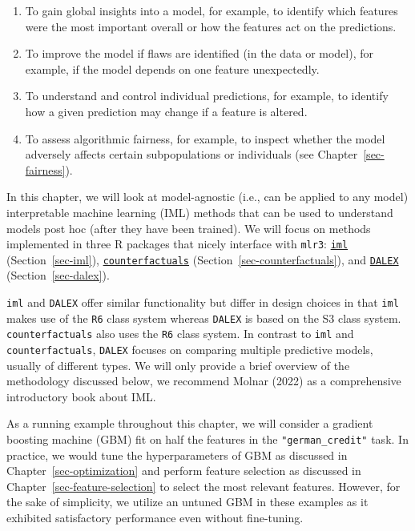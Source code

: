 \begin{enumerate}
\def\labelenumi{\arabic{enumi}.}
\tightlist
\item
  To gain global insights into a model, for example, to identify which
  features were the most important overall or how the features act on
  the predictions.
\item
  To improve the model if flaws are identified (in the data or model),
  for example, if the model depends on one feature unexpectedly.
\item
  To understand and control individual predictions, for example, to
  identify how a given prediction may change if a feature is altered.
\item
  To assess algorithmic fairness, for
  example, to inspect whether the model adversely affects certain
  subpopulations or individuals (see Chapter~\ref{sec-fairness}).
\end{enumerate}

In this chapter, we will look at model-agnostic (i.e., can be applied to
any model) interpretable machine
learning (IML) methods that can be used to
understand models post hoc (after they have been
trained). We will focus on methods implemented in three R packages that
nicely interface with \texttt{mlr3}:
\href{https://cran.r-project.org/package=iml}{\texttt{iml}}
(Section~\ref{sec-iml}),
\href{https://cran.r-project.org/package=counterfactuals}{\texttt{counterfactuals}}
(Section~\ref{sec-counterfactuals}), and
\href{https://cran.r-project.org/package=DALEX}{\texttt{DALEX}}
(Section~\ref{sec-dalex}).

\texttt{iml} and \texttt{DALEX} offer similar functionality but differ
in design choices in that \texttt{iml} makes use of the \texttt{R6}
class system whereas \texttt{DALEX} is based on the S3 class system.
\texttt{counterfactuals} also uses the \texttt{R6} class system. In
contrast to \texttt{iml} and \texttt{counterfactuals}, \texttt{DALEX}
focuses on comparing multiple predictive models, usually of different
types. We will only provide a brief overview of the methodology
discussed below, we recommend Molnar (2022) as a comprehensive
introductory book about IML.

As a running example throughout this chapter, we will consider a
gradient boosting machine (GBM) fit on half the features in the
\texttt{"german\_credit"} task. In practice, we would tune the
hyperparameters of GBM as discussed in Chapter~\ref{sec-optimization}
and perform feature selection as discussed in
Chapter~\ref{sec-feature-selection} to select the most relevant
features. However, for the sake of simplicity, we utilize an untuned GBM
in these examples as it exhibited satisfactory performance even without
fine-tuning.

